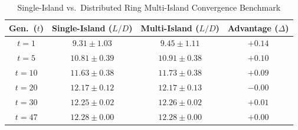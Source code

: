 \begin{table}[t]
\centering
\caption{Single-Island vs.\ Distributed Ring Multi-Island Convergence Benchmark}
\label{tab:single_vs_multi_island}
\small
\begin{tabular}{cccc}
\hline
\textbf{Gen.\ ($t$)} &
\textbf{Single-Island ($L/D$)} &
\textbf{Multi-Island ($L/D$)} &
\textbf{Advantage ($\Delta$)} \\
\hline
$t = 1$  & $9.31 \pm 1.03$  & $9.45 \pm 1.11$  & $+0.14$ \\
$t = 5$  & $10.81 \pm 0.39$ & $10.91 \pm 0.38$ & $+0.10$ \\
$t = 10$ & $11.63 \pm 0.38$ & $11.73 \pm 0.38$ & $+0.09$ \\
$t = 20$ & $12.17 \pm 0.12$ & $12.17 \pm 0.13$ & $-0.00$ \\
$t = 30$ & $12.25 \pm 0.02$ & $12.26 \pm 0.02$ & $+0.01$ \\
$t = 47$ & $12.28 \pm 0.00$ & $12.28 \pm 0.00$ & $+0.00$ \\
\hline
\end{tabular}
\normalsize
\end{table}
